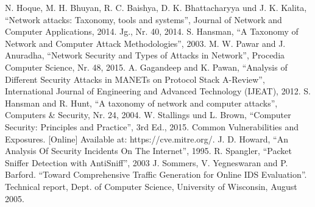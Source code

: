 \documentclass[conference]{IEEEtran}
\begin{document}
\begin{thebibliography}{00}
 N. Hoque, M. H. Bhuyan, R. C. Baishya, D. K. Bhattacharyya und J. K. Kalita, ``Network attacks: Taxonomy, tools and systems'', Journal of Network and Computer Applications, 2014. Jg., Nr. 40, 2014.
 S. Hansman,  ``A Taxonomy of Network and Computer Attack Methodologies'', 2003.
 M. W. Pawar and J. Anuradha,  ``Network Security and Types of Attacks in Network'', Procedia Computer Science,  Nr. 48, 2015.
 A. Gagandeep and K. Pawan,  ``Analysis of Different Security Attacks in MANETs on Protocol Stack A-Review'', International Journal of Engineering and Advanced Technology (IJEAT), 2012.
 S. Hansman and R. Hunt,  ``A taxonomy of network and computer attacks'', Computers \& Security, Nr. 24, 2004.
 W. Stallings und L. Brown,  ``Computer Security: Principles and Practice'',  3rd Ed., 2015.
 Common Vulnerabilities and Exposures. [Online] Available at: https://cve.mitre.org/.
 J. D. Howard,  ``An Analysis Of Security Incidents On The Internet'', 1995.
 R. Spangler, ``Packet Sniffer Detection with AntiSniff'', 2003
  J. Sommers, V. Yegneswaran and P. Barford. ``Toward Comprehensive Traffic Generation for Online IDS Evaluation''. Technical report, Dept. of Computer Science, University of Wisconsin, August 2005.
\end{thebibliography}
\end{document}
